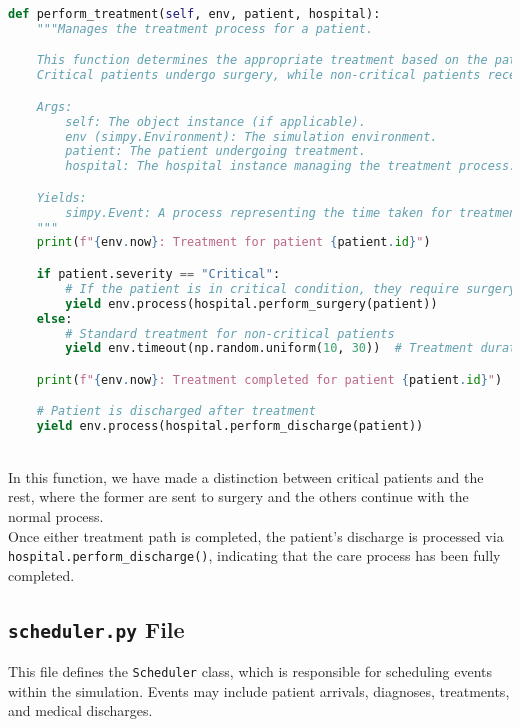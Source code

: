 \documentclass[a4paper,12pt]{article}
\begin{document}
\begin{lstlisting}[language=Python]
def perform_treatment(self, env, patient, hospital):
    """Manages the treatment process for a patient.

    This function determines the appropriate treatment based on the patient's severity.
    Critical patients undergo surgery, while non-critical patients receive standard treatment.

    Args:
        self: The object instance (if applicable).
        env (simpy.Environment): The simulation environment.
        patient: The patient undergoing treatment.
        hospital: The hospital instance managing the treatment process.

    Yields:
        simpy.Event: A process representing the time taken for treatment and discharge.
    """
    print(f"{env.now}: Treatment for patient {patient.id}")

    if patient.severity == "Critical":
        # If the patient is in critical condition, they require surgery
        yield env.process(hospital.perform_surgery(patient))
    else:
        # Standard treatment for non-critical patients
        yield env.timeout(np.random.uniform(10, 30))  # Treatment duration

    print(f"{env.now}: Treatment completed for patient {patient.id}")

    # Patient is discharged after treatment
    yield env.process(hospital.perform_discharge(patient))
\end{lstlisting}
\\
In this function, we have made a distinction between critical patients and the rest, where the former are sent to surgery and the others continue with the normal process.
\\
Once either treatment path is completed, the patient's discharge is processed via \texttt{hospital.perform\_discharge()}, indicating that the care process has been fully completed.


\subsection{\texttt{scheduler.py} File}
This file defines the \texttt{Scheduler} class, which is responsible for scheduling events within the simulation. Events may include patient arrivals, diagnoses, treatments, and medical discharges.
\end{document}
